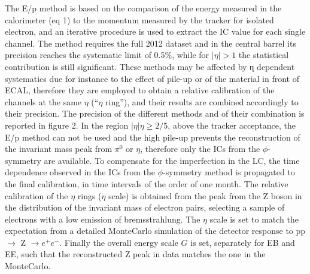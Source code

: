 \documentclass[journal]{IEEEtran}
\begin{document}
The E/p method is based on the comparison of the energy measured in the calorimeter (eq 1) to the momentum measured by the tracker for isolated electron, and an iterative procedure is used to extract the IC value for each single channel. The method requires the full 2012 dataset and in the central barrel its precision reaches the systematic limit of 0.5\%, while for $\vert\eta\vert>1$ the statistical contribution is still significant.
These methods may be affected by η dependent systematics due for instance to the effect of pile-up or of the material in front of ECAL, therefore they are employed to obtain a relative calibration of the channels at the same $\eta$ (``$\eta$ ring''), and their results are combined accordingly to their precision. The precision of the different methods and of their combination is reported in figure 2. In the region $\vert\eta\vert\eta\ge2/5$, above the tracker acceptance, the E/p method can not be used and the high pile-up prevents the reconstruction of the invariant mass peak from $\pi^0$ or $\eta$, therefore only the ICs from the $\phi$-symmetry are available.
To compensate for the imperfection in the LC, the time dependence observed in the ICs from the $\phi$-symmetry method is propagated to the final calibration, in time intervals of the order of one month.
The relative calibration of the $\eta$ rings ($\eta$ scale) is obtained from the peak from the Z boson in the distribution of the invariant mass of electron pairs, selecting a sample of electrons with a low emission of bremsstrahlung. The $\eta$ scale is set to match the expectation from a detailed MonteCarlo simulation of the detector response to pp $\to$ Z $\to e^+e^-$.
Finally the overall energy scale $G$ is set, separately for EB and EE, such that the reconstructed Z peak in data matches the one in the MonteCarlo.
\end{document}
